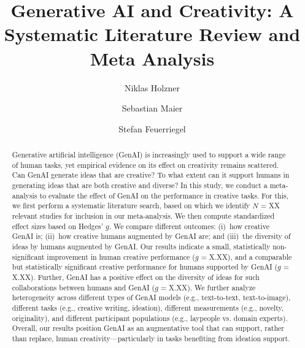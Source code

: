 \documentclass[manuscript, screen, review, acmsmall, anonymous]{acmart}
\begin{document}
\title{Generative AI and Creativity: A Systematic Literature Review and Meta Analysis}

\author{Niklas Holzner}
\author{Sebastian Maier}
\author{Stefan Feuerriegel}
\begin{abstract}
Generative artificial intelligence (GenAI) is increasingly used to support a wide range of human tasks, yet empirical evidence on its effect on creativity remains scattered. Can GenAI generate ideas that are creative? To what extent can it support humans in generating ideas that are both creative and diverse? In this study, we conduct a meta-analysis to evaluate the effect of GenAI on the performance in creative tasks. For this, we first perform a systematic literature search, based on which we identify $N$ = XX relevant studies for inclusion in our meta-analysis. We then compute standardized effect sizes based on Hedges' $g$. We compare different outcomes: (i)~how creative GenAI is; (ii)~how creative humans augmented by GenAI are; and (iii)~the diversity of ideas by humans augmented by GenAI. Our results indicate a small, statistically non-significant improvement in human creative performance ($g$ = X.XX), and a comparable but statistically significant creative performance for humans supported by GenAI ($g$ = X.XX). Further, GenAI has a positive effect on the diversity of ideas for such collaborations between humans and GenAI ($g$ = X.XX). We further analyze heterogeneity across different types of GenAI models (e.g., text-to-text, text-to-image), different tasks (e.g., creative writing, ideation), different measurements (e.g., novelty, originality), and different participant populations (e.g., laypeople vs. domain experts). Overall, our results position GenAI as an augmentative tool that can support, rather than replace, human creativity---particularly in tasks benefiting from ideation support.
\end{abstract}

\maketitle
\end{document}
